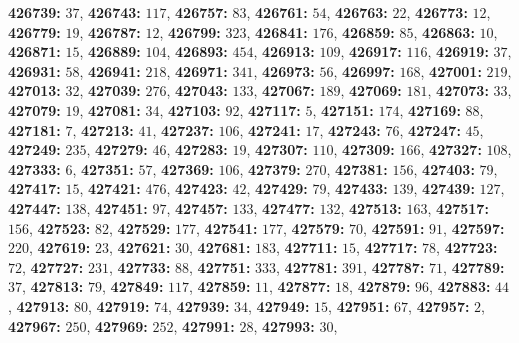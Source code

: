 \textsf{\bfseries 426739:} $37$, \textsf{\bfseries 426743:} $117$, \textsf{\bfseries 426757:} $83$, \textsf{\bfseries 426761:} $54$, \textsf{\bfseries 426763:} $22$, \textsf{\bfseries 426773:} $12$, \textsf{\bfseries 426779:} $19$, \textsf{\bfseries 426787:} $12$, \textsf{\bfseries 426799:} $323$, \textsf{\bfseries 426841:} $176$, \textsf{\bfseries 426859:} $85$, \textsf{\bfseries 426863:} $10$, \textsf{\bfseries 426871:} $15$, \textsf{\bfseries 426889:} $104$, \textsf{\bfseries 426893:} $454$, \textsf{\bfseries 426913:} $109$, \textsf{\bfseries 426917:} $116$, \textsf{\bfseries 426919:} $37$, \textsf{\bfseries 426931:} $58$, \textsf{\bfseries 426941:} $218$, \textsf{\bfseries 426971:} $341$, \textsf{\bfseries 426973:} $56$, \textsf{\bfseries 426997:} $168$, \textsf{\bfseries 427001:} $219$, \textsf{\bfseries 427013:} $32$, \textsf{\bfseries 427039:} $276$, \textsf{\bfseries 427043:} $133$, \textsf{\bfseries 427067:} $189$, \textsf{\bfseries 427069:} $181$, \textsf{\bfseries 427073:} $33$, \textsf{\bfseries 427079:} $19$, \textsf{\bfseries 427081:} $34$, \textsf{\bfseries 427103:} $92$, \textsf{\bfseries 427117:} $5$, \textsf{\bfseries 427151:} $174$, \textsf{\bfseries 427169:} $88$, \textsf{\bfseries 427181:} $7$, \textsf{\bfseries 427213:} $41$, \textsf{\bfseries 427237:} $106$, \textsf{\bfseries 427241:} $17$, \textsf{\bfseries 427243:} $76$, \textsf{\bfseries 427247:} $45$, \textsf{\bfseries 427249:} $235$, \textsf{\bfseries 427279:} $46$, \textsf{\bfseries 427283:} $19$, \textsf{\bfseries 427307:} $110$, \textsf{\bfseries 427309:} $166$, \textsf{\bfseries 427327:} $108$, \textsf{\bfseries 427333:} $6$, \textsf{\bfseries 427351:} $57$, \textsf{\bfseries 427369:} $106$, \textsf{\bfseries 427379:} $270$, \textsf{\bfseries 427381:} $156$, \textsf{\bfseries 427403:} $79$, \textsf{\bfseries 427417:} $15$, \textsf{\bfseries 427421:} $476$, \textsf{\bfseries 427423:} $42$, \textsf{\bfseries 427429:} $79$, \textsf{\bfseries 427433:} $139$, \textsf{\bfseries 427439:} $127$, \textsf{\bfseries 427447:} $138$, \textsf{\bfseries 427451:} $97$, \textsf{\bfseries 427457:} $133$, \textsf{\bfseries 427477:} $132$, \textsf{\bfseries 427513:} $163$, \textsf{\bfseries 427517:} $156$, \textsf{\bfseries 427523:} $82$, \textsf{\bfseries 427529:} $177$, \textsf{\bfseries 427541:} $177$, \textsf{\bfseries 427579:} $70$, \textsf{\bfseries 427591:} $91$, \textsf{\bfseries 427597:} $220$, \textsf{\bfseries 427619:} $23$, \textsf{\bfseries 427621:} $30$, \textsf{\bfseries 427681:} $183$, \textsf{\bfseries 427711:} $15$, \textsf{\bfseries 427717:} $78$, \textsf{\bfseries 427723:} $72$, \textsf{\bfseries 427727:} $231$, \textsf{\bfseries 427733:} $88$, \textsf{\bfseries 427751:} $333$, \textsf{\bfseries 427781:} $391$, \textsf{\bfseries 427787:} $71$, \textsf{\bfseries 427789:} $37$, \textsf{\bfseries 427813:} $79$, \textsf{\bfseries 427849:} $117$, \textsf{\bfseries 427859:} $11$, \textsf{\bfseries 427877:} $18$, \textsf{\bfseries 427879:} $96$, \textsf{\bfseries 427883:} $44$, \textsf{\bfseries 427913:} $80$, \textsf{\bfseries 427919:} $74$, \textsf{\bfseries 427939:} $34$, \textsf{\bfseries 427949:} $15$, \textsf{\bfseries 427951:} $67$, \textsf{\bfseries 427957:} $2$, \textsf{\bfseries 427967:} $250$, \textsf{\bfseries 427969:} $252$, \textsf{\bfseries 427991:} $28$, \textsf{\bfseries 427993:} $30$, 
